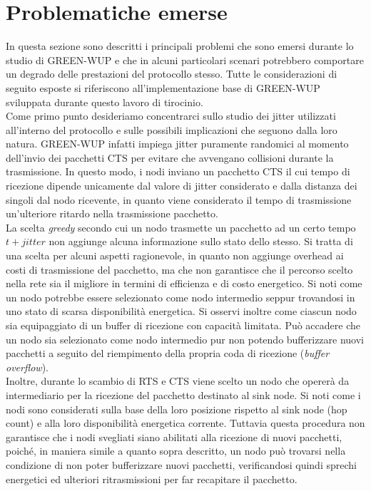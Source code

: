 \documentclass[binding=0.6cm,TFA]{sapthesis}
\begin{document}
\section{Problematiche emerse}

In questa sezione sono descritti i principali problemi che sono emersi durante lo studio di GREEN-WUP e che in alcuni particolari
scenari potrebbero comportare un degrado delle prestazioni del protocollo stesso. Tutte le considerazioni di seguito esposte si riferiscono
all'implementazione base di GREEN-WUP sviluppata durante questo lavoro di tirocinio.\\

Come primo punto desideriamo concentrarci sullo studio dei jitter utilizzati all'interno del protocollo e sulle possibili implicazioni che seguono dalla loro
natura. GREEN-WUP infatti impiega jitter puramente randomici al momento dell'invio dei pacchetti CTS per evitare che avvengano collisioni durante
la trasmissione. In questo modo, i nodi inviano un pacchetto CTS il cui tempo di ricezione dipende unicamente dal valore di jitter
considerato e dalla distanza dei singoli dal nodo ricevente, in quanto viene considerato il tempo di trasmissione un'ulteriore ritardo nella
trasmissione pacchetto.\\

La scelta \emph{greedy} secondo cui un nodo trasmette un pacchetto ad un certo tempo $t+jitter$ non aggiunge alcuna informazione sullo stato dello stesso.
Si tratta di una scelta per alcuni aspetti ragionevole, in quanto non aggiunge overhead ai costi di trasmissione del pacchetto, ma che non garantisce che
il percorso scelto nella rete sia il migliore in termini di efficienza e di costo energetico. Si noti come un nodo potrebbe essere selezionato come nodo
intermedio seppur trovandosi in uno stato di scarsa disponibilità energetica. Si osservi inoltre come ciascun nodo sia equipaggiato di un buffer di ricezione
con capacità limitata. Può accadere che un nodo sia selezionato come nodo intermedio pur non potendo bufferizzare nuovi pacchetti a
seguito del riempimento della propria coda di ricezione (\emph{buffer overflow}).\\

Inoltre, durante lo scambio di RTS e CTS viene scelto un nodo che opererà da intermediario per la ricezione del pacchetto destinato al sink node. Si noti
come i nodi sono considerati sulla base della loro posizione rispetto al sink node (hop count) e alla loro disponibilità energetica corrente.
Tuttavia questa procedura non garantisce che i nodi svegliati siano abilitati alla ricezione di nuovi pacchetti, poiché, in maniera simile a quanto
sopra descritto, un nodo può trovarsi nella condizione di non poter bufferizzare nuovi pacchetti, verificandosi quindi sprechi energetici ed
ulteriori ritrasmissioni per far recapitare il pacchetto.\\
\end{document}
